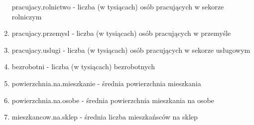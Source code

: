\documentclass[polish,]{book}
\begin{document}
\begin{enumerate}
  pracujacy.rolnictwo - liczba (w tysiącach) osób pracujących w sekorze rolniczym
\item
  pracujacy.przemysl - liczba (w tysiącach) osób pracujących w przemyśle
\item
  pracujacy.uslugi - liczba (w tysiącach) osób pracujących w sekorze usługowym
\item
  bezrobotni - liczba (w tysiącach) bezrobotnych
\item
  powierzchnia.na.mieszkanie - średnia powierzchnia mieszkania
\item
  powierzchnia.na.osobe - średnia powierzchnia mieszkania na osobe
\item
  mieszkancow.na.sklep - średnia liczba mieszkańsców na sklep
\end{enumerate}


\end{document}
